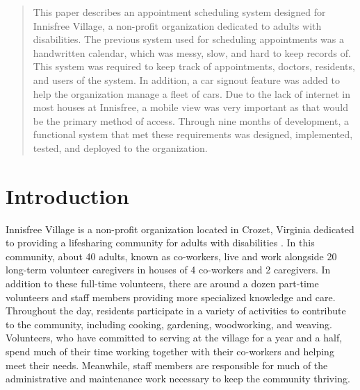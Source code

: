 \documentclass{sig-alternate}
\begin{document}
\maketitle
\begin{abstract}
This paper describes an appointment scheduling system designed for Innisfree Village, a non-profit organization dedicated to adults with disabilities. The previous system used for scheduling appointments was a handwritten calendar, which was messy, slow, and hard to keep records of. This system was required to keep track of appointments, doctors, residents, and users of the system. In addition, a car signout feature was added to help the organization manage a fleet of cars. Due to the lack of internet in most houses at Innisfree, a mobile view was very important as that would be the primary method of access. Through nine months of development, a functional system that met these requirements was designed, implemented, tested, and deployed to the organization.
\end{abstract}




\section{Introduction}
Innisfree Village is a non-profit organization located in Crozet, Virginia dedicated to providing a lifesharing community for adults with disabilities \cite{innisfree}. In this community, about 40 adults, known as co-workers, live and work alongside 20 long-term volunteer caregivers in houses of 4 co-workers and 2 caregivers. In addition to these full-time volunteers, there are around a dozen part-time volunteers and staff members providing more specialized knowledge and care. Throughout the day, residents participate in a variety of activities to contribute to the community, including cooking, gardening, woodworking, and weaving. Volunteers, who have committed to serving at the village for a year and a half, spend much of their time working together with their co-workers and helping meet their needs. Meanwhile, staff members are responsible for much of the administrative and maintenance work necessary to keep the community thriving.
\end{document}
